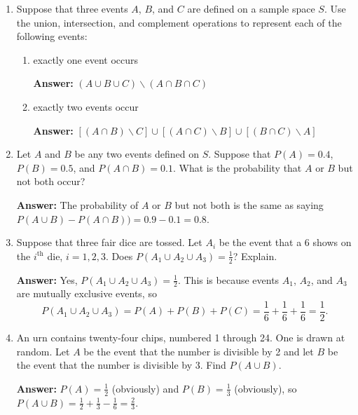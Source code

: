 \documentclass{article}
\begin{document}
\begin{enumerate}
        \item Suppose that three events $A$, $B$, and $C$ are deﬁned on a sample space $S$. Use the union, intersection, and complement operations to represent each of the following events:
            \begin{enumerate}
                \item exactly one event occurs
                
                    \textbf{Answer:} $(A \cup B \cup C) \backslash (A \cap B \cap C)$\\
                    
                \item exactly two events occur
                
                    \textbf{Answer:} $[(A \cap B) \backslash C] \cup [(A \cap C) \backslash B] \cup [(B \cap C) \backslash A]$\\
            \end{enumerate}
            
        \item Let $A$ and $B$ be any two events deﬁned on $S$. Suppose that $P(A) = 0.4$, $P(B) = 0.5$, and $P(A \cap B) = 0.1$. What is the probability that $A$ or $B$ but not both occur?
        
            \textbf{Answer:} The probability of $A$ or $B$ but not both is the same as saying $P(A \cup B) - P(A \cap B)) = 0.9 - 0.1 = 0.8$.\\
    
        \item Suppose that three fair dice are tossed. Let $A_i$ be the event that a 6 shows on the $i^{\text{th}}$ die, $i=1, 2, 3$. Does $P(A_1 \cup A_2 \cup A_3) = \frac{1}{2}$? Explain.
            
            \textbf{Answer:} Yes, $P(A_1 \cup A_2 \cup A_3) = \frac{1}{2}$. This is because events $A_1$, $A_2$, and $A_3$ are mutually exclusive events, so
            \[P(A_1 \cup A_2 \cup A_3) = P(A) + P(B) + P(C) = \frac{1}{6} + \frac{1}{6} + \frac{1}{6} = \frac{1}{2}.\]
            
         \item An urn contains twenty-four chips, numbered 1 through 24. One is drawn at random. Let $A$ be the event that the number is divisible by 2 and let $B$ be the event that the number is divisible by 3. Find $P(A \cup B)$.
        
            \textbf{Answer:} $P(A) = \frac{1}{2}$ (obviously) and $P(B) = \frac{1}{3}$ (obviously), so $P(A \cup B) = \frac{1}{2} + \frac{1}{3} - \frac{1}{6} = \frac{2}{3}$.\\
         

\end{enumerate}
\end{document}
